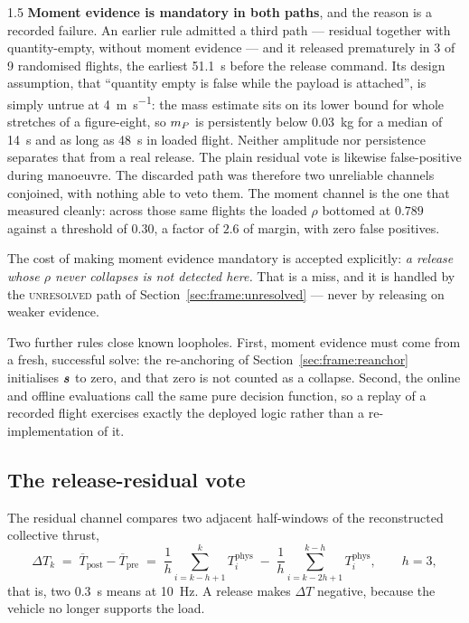 \begin{spacing}{1.5}
\textbf{Moment evidence is mandatory in both paths}, and the reason is a recorded
failure. An earlier rule admitted a third path --- residual together with
quantity-empty, without moment evidence --- and it released prematurely in 3 of 9
randomised flights, the earliest \SI{51.1}{\second} before the release command.
Its design assumption, that ``quantity empty is false while the payload is
attached'', is simply untrue at \SI{4}{\meter\per\second}: the mass estimate sits
on its lower bound for whole stretches of a figure-eight, so $m_P$ is
persistently below \SI{0.03}{\kg} for a median of \SI{14}{\second} and as long as
\SI{48}{\second} in loaded flight. Neither amplitude nor persistence separates
that from a real release. The plain residual vote is likewise false-positive
during manoeuvre. The discarded path was therefore two unreliable channels
conjoined, with nothing able to veto them. The moment channel is the one that
measured cleanly: across those same flights the loaded $\rho$ bottomed at
$0.789$ against a threshold of $0.30$, a factor of $2.6$ of margin, with zero
false positives.

The cost of making moment evidence mandatory is accepted explicitly: \emph{a
release whose $\rho$ never collapses is not detected here.} That is a miss, and
it is handled by the \textsc{unresolved} path of
Section~\ref{sec:frame:unresolved} --- never by releasing on weaker evidence.

Two further rules close known loopholes. First, moment evidence must come from a
fresh, successful solve: the re-anchoring of Section~\ref{sec:frame:reanchor}
initialises $\bm{s}$ to zero, and that zero is not counted as a collapse. Second,
the online and offline evaluations call the same pure decision function, so a
replay of a recorded flight exercises exactly the deployed logic rather than a
re-implementation of it.

\subsection{The release-residual vote}\label{sec:frame:resid}

The residual channel compares two adjacent half-windows of the reconstructed
collective thrust,
\begin{equation}
\Delta T_k \;=\; \overline{T}_{\mathrm{post}} - \overline{T}_{\mathrm{pre}}
\;=\; \frac{1}{h}\sum_{i=k-h+1}^{k} T^{\mathrm{phys}}_{i}
\;-\; \frac{1}{h}\sum_{i=k-2h+1}^{k-h} T^{\mathrm{phys}}_{i} ,
\qquad h=3 ,
\label{eq:deltaT}
\end{equation}
that is, two \SI{0.3}{\second} means at \SI{10}{\hertz}. A release makes
$\Delta T$ negative, because the vehicle no longer supports the load.


\end{spacing}
